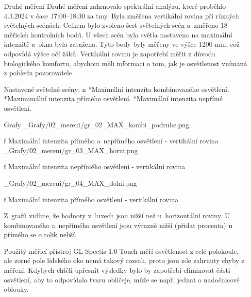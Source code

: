 \sec Druhé měření
Druhé měření zahrnovalo spektrální analýzu, které proběhlo 4.3.2024 v čase 17:00--18:30 za tmy.
Byla změřena vertikální rovina při různých světelných scénách.
Celkem bylo zvoleno šest světelných scén a~změřeno 18 měřicích kontrolních bodů. U všech scén byla světla nastavena na maximální intenzitě a~okna byla zatažena.
Tyto body byly měřeny ve výšce 1200 mm, což odpovídá výšce očí žáků. Vertikální
rovinu je zapotřebí měřit z důvodu biologického komfortu, abychom měli informaci
o tom, jak je osvětlenost vnímaná z pohledu pozorovatele

\medskip\noindent
{\sbf Nastavené světelné scény:}
\begitems \style n
    *Maximální intenzita kombinovaného osvětlení.
    *Maximimální intenzita přímého osvětlení.
    *Maximální intenzita nepřímé osvětlení.
\enditems

\secc Grafy
\medskip {}
\picw=15cm _Grafy/02_mereni/gr_02_MAX_kombi_podruhe.png
\caption/f Maximální intenzita přímého a~nepřímého osvětlení - vertikální rovina
\medskip {}
\picw=15cm _Grafy/02_mereni/gr_03_MAX_horni.png
\caption/f Maximální intenzita nepřímého osvětlení - vertikální rovina

\medskip {}
\picw=15cm _Grafy/02_mereni/gr_04_MAX_dolni.png
\caption/f Maximální intenzita přímého osvětlení - vertikální rovina
\medskip

Z~grafů vidíme, že hodnoty v~luxech jsou nižší než u~horizontální roviny. U kombinovaného a~nepřímého osvětlení jsou výrazně nižší (přidat procenta)
u přímého se o tolik neliší.

Použitý měřicí přístroj GL Spectis 1.0 Touch měří osvětlenost z celé polokoule, ale zorné pole lidského oko nemá takový rozsah, proto
jsou zde zahrnuty chyby z měření. Kdybych chtěli upřesnit výsledky bylo by zapotřebí eliminovat části osvětlení, aby to odpovídalo tvaru obličeje, může se např.
jednat o nadočnicové oblouky.
\medskip




